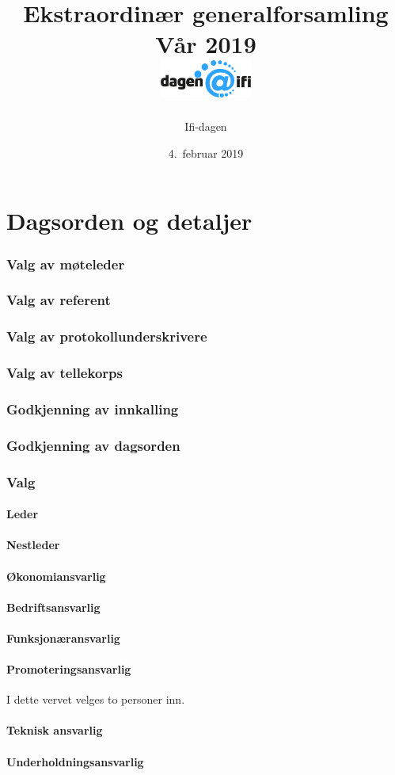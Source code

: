 \documentclass[10pt,norsk,a4paper]{article}
\title{Ekstraordinær generalforsamling \\
	Vår 2019\\[3cm]
	\includegraphics[width=3cm,trim=0 4cm 0 0]{../../res/logo.png}\\}
\date{4.\ februar 2019}
\author{Ifi-dagen}
\begin{document}
\maketitle{}
\newpage
\part{Dagsorden og detaljer}
\tableofcontents{}
\newpage


\section{Valg av møteleder}

\section{Valg av referent}

\section{Valg av protokollunderskrivere}

\section{Valg av tellekorps}

\section{Godkjenning av innkalling}

\section{Godkjenning av dagsorden}

\section{Valg}

\subsection{Leder}
\subsection{Nestleder}
\subsection{Økonomiansvarlig}
\subsection{Bedriftsansvarlig}
\subsection{Funksjonæransvarlig}
\subsection{Promoteringsansvarlig}
I dette vervet velges to personer inn.
\subsection{Teknisk ansvarlig}
\subsection{Underholdningsansvarlig}\label{lastpage}
\end{document}
